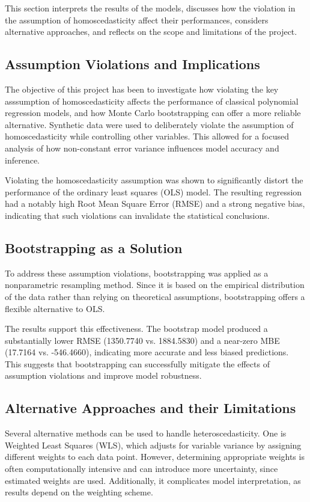 This section interprets the results of the models, discusses how the violation in the assumption of homoscedasticity affect their performances, considers alternative approaches, and reflects on the scope and limitations of the project.

\subsection{Assumption Violations and Implications}
The objective of this project has been to investigate how violating the key asssumption of homoscedasticity affects the performance of classical polynomial regression models, and how Monte Carlo bootstrapping can offer a more reliable alternative. Synthetic data were used to deliberately violate the assumption of homoscedasticity while controlling other variables. This allowed for a focused analysis of how non-constant error variance influences model accuracy and inference.

\noindent Violating the homoscedasticity assumption was shown to significantly distort the performance of the ordinary least squares (OLS) model. The resulting regression had a notably high Root Mean Square Error (RMSE) and a strong negative bias, indicating that such violations can invalidate the statistical conclusions. 

\subsection{Bootstrapping as a Solution}
To address these assumption violations, bootstrapping was applied as a nonparametric resampling method. Since it is based on the empirical distribution of the data rather than relying on theoretical assumptions, bootstrapping offers a flexible alternative to OLS.

\noindent The results support this effectiveness. The bootstrap model produced a substantially lower RMSE (1350.7740 vs. 1884.5830) and a near-zero MBE (17.7164 vs. -546.4660), indicating more accurate and less biased predictions. This suggests that bootstrapping can successfully mitigate the effects of assumption violations and improve model robustness.

\subsection{Alternative Approaches and their Limitations}
Several alternative methods can be used to handle heteroscedasticity. One is Weighted Least Squares (WLS), which adjusts for variable variance by assigning different weights to each data point. However, determining appropriate weights is often computationally intensive and can introduce more uncertainty, since estimated weights are used. Additionally, it complicates model interpretation, as results depend on the weighting scheme.

